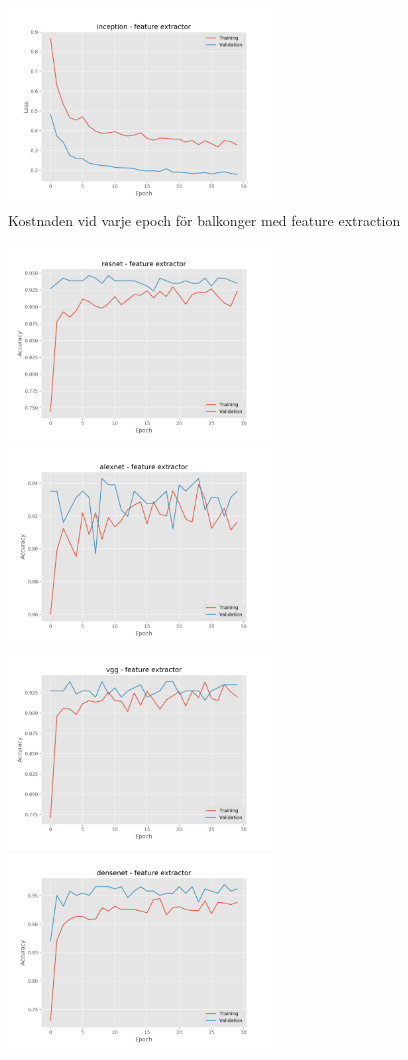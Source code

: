 \documentclass[]{kththesis}
\begin{document}
\begin{figure}[h]
    \includegraphics[width=7cm]{b_l_inception_fe}
    \caption{Kostnaden vid varje epoch för balkonger med feature extraction}
    \label{fig:b_l_1}
  \end{figure}
  
  \begin{figure}[h]
    \includegraphics[width=7cm]{b_a_resnet_fe}
    \includegraphics[width=7cm]{b_a_alexnet_fe}
    \includegraphics[width=7cm]{b_a_vgg_fe}
    \includegraphics[width=7cm]{b_a_densenet_fe}

\end{figure}
\end{document}
